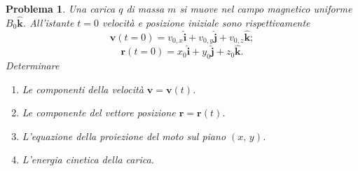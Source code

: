 \documentclass[b5paper,twoside]{book}
\newtheorem{problema}{Problema}
\renewcommand{\vec}[1]{\mathbf{#1}}
\renewcommand{\hat}[1]{\widehat{\mathbf{#1}}}
\begin{document}
\begin{problema}%
	Una carica $q$ di massa $m$ si muove nel campo magnetico uniforme $B_0\hat{k}$. All'istante $t=0$ velocità e posizione iniziale sono rispettivamente
	$$
	\vec{v}(t=0) = v_{0,x}\hat{i} + v_{0,y}\hat{j} + v_{0,z}\hat{k};
	$$
	$$
	\vec{r}(t=0) = x_0\hat{i} + y_0\hat{j} + z_0\hat{k}.
	$$
	Determinare
	\begin{enumerate}
		\item Le componenti della velocità $\vec{v} = \vec{v}(t)$.
		\item Le componente del vettore posizione $\vec{r} = \vec{r}(t)$.
		\item L'equazione della proiezione del moto sul piano $(x,\,y)$.
		\item L'energia cinetica della carica.
	\end{enumerate}
\end{problema}
\end{document}

